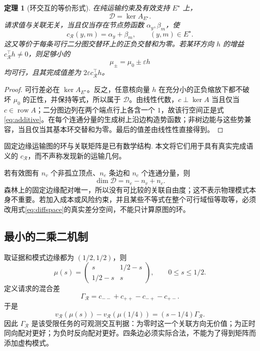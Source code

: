 \documentclass[UTF8,11pt,a4paper,fontset=fandol]{ctexart}
\numberwithin{equation}{section}
\newtheorem{theorem}{定理}[section]
\theoremstyle{definition}
\DeclareMathOperator{\row}{row}
\begin{document}
\begin{theorem}[环交互的等价形式]
\label{thm:cycle}
在纯运输约束及有效支持 $E^\star$ 上，
\begin{equation}
\mathcal D=\ker A_{E^\star}.
\end{equation}
请求值与关联无关，当且仅当存在节点势函数 $\alpha_y,\beta_m$，使
\begin{equation}
c_{\mathcal R}(y,m)=\alpha_y+\beta_m,\qquad (y,m)\in E^\star.
\label{eq:additive}
\end{equation}
这又等价于每条可行二分图交替环上的正负交替和为零。若某环方向 $h$ 的增益 $c_{\mathcal R}^\top h\ne0$，则足够小的
\begin{equation}
\mu_\pm=\mu_0\pm\varepsilon h
\end{equation}
均可行，且其完成值差为 $2\varepsilon c_{\mathcal R}^\top h$。
\end{theorem}
\begin{proof}
可行差必在 $\ker A_{E^\star}$。反之，任意核向量 $h$ 在充分小的正负缩放下都不破坏 $\mu_0$ 的正性，并保持等式，所以属于 $\mathcal D$。由线性代数，$c\perp\ker A$ 当且仅当 $c\in\row A$；二分图边列在两个端点行上各含一个 $1$，故该行空间正是式\eqref{eq:additive}。在每个连通分量的生成树上沿边构造势函数；非树边能与这些势兼容，当且仅当其基本环交替和为零。最后的值差由线性性直接得到。\end{proof}
固定边缘运输图的环与关联矩阵是已有数学结构\cite{transportpoly}. 本文将它们用于具有真实完成语义的 $c_{\mathcal R}$，而不声称发现新的运输几何。

若有效图有 $n_v$ 个非孤立顶点、$n_e$ 条边和 $n_c$ 个连通分量，则
\begin{equation}
\dim\mathcal D=n_e-n_v+n_c.
\end{equation}
森林上的固定边缘配对唯一，所以没有可比较的关联自由度；这不表示物理模式本身不重要。若加入成本或风险约束，并且某些不等式在整个可行域恒等取等，必须改用式\eqref{eq:diffspace}的真实差分空间，不能只计算原图的环。

\subsection{最小的二乘二机制}
取证据和模式边缘都为 $(1/2,1/2)$，则
\begin{equation}
\mu(s)=\begin{pmatrix}s&1/2-s\\1/2-s&s\end{pmatrix},
\qquad 0\le s\le 1/2.
\end{equation}
定义请求的混合差
\begin{equation}
\Gamma_{\mathcal R}=c_{--}+c_{++}-c_{-+}-c_{+-}.
\label{eq:gamma}
\end{equation}
于是
\begin{equation}
v_{\mathcal R}(\mu(s))-v_{\mathcal R}(\mu(1/4))
=(s-1/4)\Gamma_{\mathcal R}.
\label{eq:binarycontrast}
\end{equation}
因此 $\Gamma_{\mathcal R}$ 是该受限任务的可观测交互判据：为零时这一个关联方向无价值；为正时同向配对更好；为负时反向配对更好。四条边必须实际合法，不能为了得到矩阵而添加虚构模式。
\end{document}
